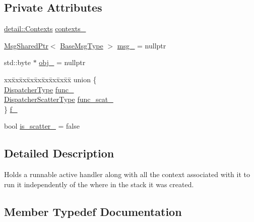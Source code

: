 \subsection*{Private Attributes}
\begin{DoxyCompactItemize}
\item 
\hyperlink{structvt_1_1runnable_1_1detail_1_1_contexts}{detail\+::\+Contexts} \hyperlink{structvt_1_1runnable_1_1_runnable_new_a067b986e570ea6cb09eeb46720b27971}{contexts\+\_\+}
\item 
\hyperlink{namespacevt_ab2b3d506ec8e8d1540aede826d84a239}{Msg\+Shared\+Ptr}$<$ \hyperlink{namespacevt_a44d0d4e144748f2b19a1cfd962f50338}{Base\+Msg\+Type} $>$ \hyperlink{structvt_1_1runnable_1_1_runnable_new_a1998ba5d1d29bada29c94d884f906d11}{msg\+\_\+} = nullptr
\item 
std\+::byte $\ast$ \hyperlink{structvt_1_1runnable_1_1_runnable_new_ab0588268b7cc8acb15c705e14331ae0c}{obj\+\_\+} = nullptr
\item 
\begin{tabbing}
xx\=xx\=xx\=xx\=xx\=xx\=xx\=xx\=xx\=\kill
union \{\\
\>\hyperlink{structvt_1_1runnable_1_1_runnable_new_ad0cb55d8e34960ef9dd139638cb721cd}{DispatcherType} \hyperlink{structvt_1_1runnable_1_1_runnable_new_ac73d475f0e3e8aeebb28caefcbcf60e8}{func\_}\\
\>\hyperlink{structvt_1_1runnable_1_1_runnable_new_a1e5173d3a71a30f4901c61b7de4092c6}{DispatcherScatterType} \hyperlink{structvt_1_1runnable_1_1_runnable_new_a0efbf8e5086cf724b0fd0318f9433d8c}{func\_scat\_}\\
\} \hyperlink{structvt_1_1runnable_1_1_runnable_new_af29cbd1944bfb1e592e96c33c8a98d53}{f\_}\\

\end{tabbing}\item 
bool \hyperlink{structvt_1_1runnable_1_1_runnable_new_a5ab5b788e1b0a989be9c1bd62f58af1d}{is\+\_\+scatter\+\_\+} = false
\end{DoxyCompactItemize}


\subsection{Detailed Description}
Holds a runnable active handler along with all the context associated with it to run it independently of the where in the stack it was created. 

\subsection{Member Typedef Documentation}
\mbox{\label{structvt_1_1runnable_1_1_runnable_new_a1e5173d3a71a30f4901c61b7de4092c6}} 

